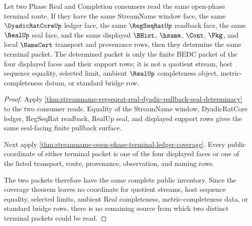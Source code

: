 \begin{theorem}
\label{thm:streamname-open-phase-terminal-readback-determinacy}
Let two Phase Real and Completion consumers read the same open-phase terminal route. If they have the same StreamName window face, the same $\DyadicRatCoreUp$ ledger face, the same $\RegSeqRatUp$ readback face, the same $\RealUp$ seal face, and the same displayed $\BHist$, $\hsame$, $\Cont$, $\Pkg$, and local $\NameCert$ transport and provenance rows, then they determine the same terminal packet. The determined packet is only the finite BEDC packet of the four displayed faces and their support rows; it is not a quotient stream, host sequence equality, selected limit, ambient $\RealUp$ completeness object, metric-completeness datum, or standard bridge row.
\end{theorem}
\begin{proof}
Apply \autoref{thm:streamname-regseqrat-real-dyadic-pullback-seal-determinacy} to the two consumer reads. Equality of the StreamName window, DyadicRatCore ledger, RegSeqRat readback, RealUp seal, and displayed support rows gives the same seal-facing finite pullback surface.

Next apply \autoref{thm:streamname-open-phase-terminal-ledger-coverage}. Every public coordinate of either terminal packet is one of the four displayed faces or one of the listed transport, route, provenance, observation, and naming rows.

The two packets therefore have the same complete public inventory. Since the coverage theorem leaves no coordinate for quotient streams, host sequence equality, selected limits, ambient Real completeness, metric-completeness data, or standard bridge rows, there is no remaining source from which two distinct terminal packets could be read.
\end{proof}

